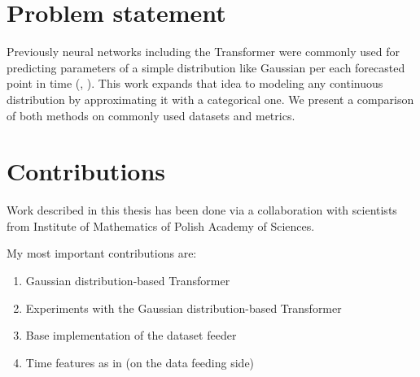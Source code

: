 \documentclass[en]{pracamgr}
\newcommand{\pk}[1]{\textcolor{red}{\small [pk: #1]}}
\newcommand{\mn}[1]{\textcolor{purple}{\small [mn: #1]}}
\begin{document}
\section*{Problem statement}\label{r:problemst}

Previously neural networks including the Transformer were commonly used for predicting parameters of a simple distribution like Gaussian per each forecasted point in time (\cite{deepar}, \cite{enhancing}). This work expands that idea to modeling any continuous distribution by approximating it with a categorical one. We present a comparison of both methods on commonly used datasets and metrics.





\section*{Contributions}\label{r:contributions}

Work described in this thesis has been done via a collaboration with scientists from Institute of Mathematics of Polish Academy of Sciences.

My most important contributions are:
\begin{enumerate}
	\item Gaussian distribution-based Transformer
	\item Experiments with the Gaussian distribution-based Transformer
	\item Base implementation of the dataset feeder
	\item Time features as in \cite{enhancing} (on the data feeding side)
\end{enumerate}
\end{document}
